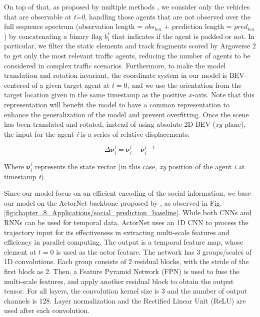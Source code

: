 On top of that, as proposed by multiple methods \cite{liang2020learning, gomez2023improving}, we consider only the vehicles that are observable at \textit{t=0}, handling those agents that are not observed over the full sequence spectrum (observation length = \textit{$obs_{len}$} + prediction length = \textit{$pred_{len}$}) by concatenating a binary flag $b_i^t$ that indicates if the agent is padded or not. In particular, we filter the static elements and track fragments scored by Argoverse 2 to get only the most relevant traffic agents, reducing the number of agents to be considered in complex traffic scenarios. Furthermore, to make the model translation and rotation invariant, the coordinate system in our model is BEV-centered of a given target agent at $t = 0$, and we use the orientation from the target location given in the same timestamp as the positive $x$-axis. Note that this representation will benefit the model to have a common representation to enhance the generalization of the model and prevent overfitting. Once the scene has been translated and rotated, instead of using absolute 2D-BEV (\textit{xy} plane), the input for the agent \textit{i} is a series of relative displacements:

\begin{equation}
	\Delta \boldsymbol{\nu}^{t}_i = \boldsymbol{\nu}^{t}_i - \boldsymbol{\nu}^{t-1}_i
\end{equation}

Where $\boldsymbol{\nu}^{t}_i$ represents the state vector (in this case, \textit{xy} position of the agent \textit{i} at timestamp \textit{t}).

Since our model focus on an efficient encoding of the social information, we base our model on the ActorNet backbone proposed by \cite{liang2020learning}, as observed in Fig. \ref{fig:chapter_8_Applications/social_prediction_baseline}. While both CNNs and RNNs can be used for temporal data, ActorNet uses an 1D CNN to process the trajectory input for its effectiveness in extracting multi-scale features and efficiency in parallel computing. The output is a temporal feature map, whose element at $t=0$ is used as the actor feature. The network has $3$ groups/scales of 1D convolutions. Each group consists of $2$ residual blocks, with the stride of the first block as $2$. Then, a Feature Pyramid Network (FPN) \cite{lin2017feature} is used to fuse the multi-scale features, and apply another residual block to obtain the output tensor. For all layers, the convolution kernel size is $3$ and the number of output channels is $128$. Layer normalization and the Rectified Linear Unit (ReLU) are used after each convolution. 

